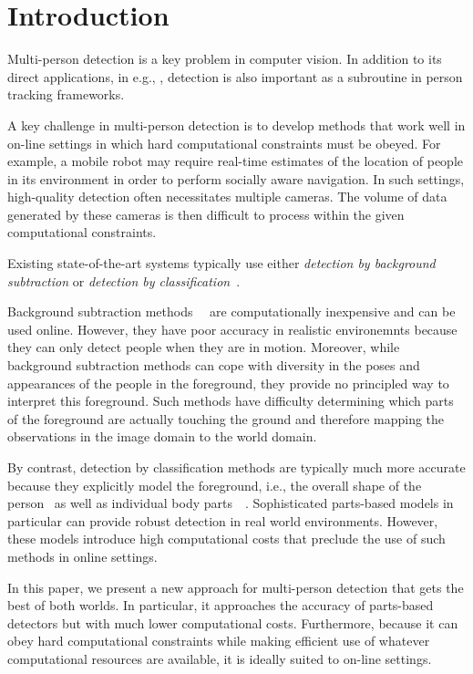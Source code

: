 \documentclass[10pt,twocolumn,letterpaper]{article}
\begin{document}
\section{Introduction}
Multi-person detection is a key problem in computer vision.  In addition to its direct applications, in e.g., , detection is also important as a subroutine in person tracking  frameworks.  

A key challenge in multi-person detection is to develop methods that work well in on-line settings in which hard computational constraints must be obeyed. For example, a mobile robot may require real-time  estimates of the location of people in its environment in order to perform socially aware navigation.  In such settings, high-quality detection often necessitates multiple cameras.  The volume of data generated by these cameras is then difficult to process within the given computational constraints.  

Existing state-of-the-art systems typically use either \emph{detection by background subtraction}  or \emph{detection by classification}~\cite{Pami-11}.

Background subtraction methods~\cite{bk1}~\cite{bk2-bayesian} are computationally inexpensive and can be used online. However, they have poor accuracy in realistic environemnts because they can only detect people when they are in motion. 
Moreover, while background subtraction methods can cope with diversity in the poses and appearances of the people in the foreground, they provide no principled way to interpret this foreground. Such methods have difficulty determining which parts of the foreground are actually touching the ground and therefore mapping the observations in the image domain to the world domain.

By contrast, detection by classification methods are typically much more accurate because they explicitly model the foreground, i.e., the overall shape of the person~\cite{dalaltriggs} as well as individual body parts~\cite{DPM}~\cite{partsDeva}.  Sophisticated parts-based models in particular can provide robust detection in real world environments.  However, these models introduce high computational costs that preclude the use of such methods in online settings.

In this paper, we present a new approach for multi-person detection that gets the best of both worlds.  In particular, it approaches the accuracy of parts-based detectors but with much lower computational costs.  Furthermore, because it can obey hard computational constraints while making efficient use of whatever computational resources are available, it is ideally suited to on-line settings.
\end{document}
